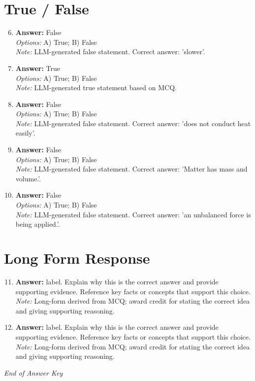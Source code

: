 \documentclass[12pt]{article}
\begin{document}
\section*{True / False}
\begin{enumerate}[label=\arabic*.]
\setcounter{enumi}{5}
\item \textbf{Answer:} False
\\ \textit{Options:} A) True; B) False
\\ \textit{Note:} LLM-generated false statement. Correct answer: 'slower'.
\item \textbf{Answer:} True
\\ \textit{Options:} A) True; B) False
\\ \textit{Note:} LLM-generated true statement based on MCQ.
\item \textbf{Answer:} False
\\ \textit{Options:} A) True; B) False
\\ \textit{Note:} LLM-generated false statement. Correct answer: 'does not conduct heat easily'.
\item \textbf{Answer:} False
\\ \textit{Options:} A) True; B) False
\\ \textit{Note:} LLM-generated false statement. Correct answer: 'Matter has mass and volume.'.
\item \textbf{Answer:} False
\\ \textit{Options:} A) True; B) False
\\ \textit{Note:} LLM-generated false statement. Correct answer: 'an unbalanced force is being applied.'.
\end{enumerate}

\section*{Long Form Response}
\begin{enumerate}[label=\arabic*.]
\setcounter{enumi}{10}
\item \textbf{Answer:} label. Explain why this is the correct answer and provide supporting evidence. Reference key facts or concepts that support this choice.
\\ \textit{Note:} Long-form derived from MCQ; award credit for stating the correct idea and giving supporting reasoning.
\item \textbf{Answer:} label. Explain why this is the correct answer and provide supporting evidence. Reference key facts or concepts that support this choice.
\\ \textit{Note:} Long-form derived from MCQ; award credit for stating the correct idea and giving supporting reasoning.
\end{enumerate}

\vfill
\noindent\textit{End of Answer Key}
\end{document}
